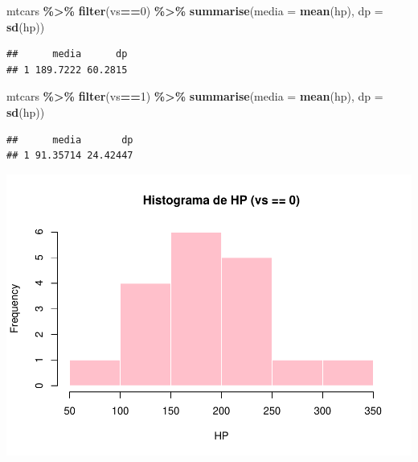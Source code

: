 \documentclass[
]{book}
\newenvironment{Shaded}{\begin{snugshade}}{\end{snugshade}}
\newcommand{\AttributeTok}[1]{\textcolor[rgb]{0.13,0.29,0.53}{#1}}
\newcommand{\DecValTok}[1]{\textcolor[rgb]{0.00,0.00,0.81}{#1}}
\newcommand{\FunctionTok}[1]{\textcolor[rgb]{0.13,0.29,0.53}{\textbf{#1}}}
\newcommand{\NormalTok}[1]{#1}
\newcommand{\SpecialCharTok}[1]{\textcolor[rgb]{0.81,0.36,0.00}{\textbf{#1}}}
\newcommand{\StringTok}[1]{\textcolor[rgb]{0.31,0.60,0.02}{#1}}
\begin{document}
\begin{Shaded}
\begin{Highlighting}[]
\NormalTok{mtcars }\SpecialCharTok{\%\textgreater{}\%} \FunctionTok{filter}\NormalTok{(vs}\SpecialCharTok{==}\DecValTok{0}\NormalTok{) }\SpecialCharTok{\%\textgreater{}\%} \FunctionTok{summarise}\NormalTok{(}\AttributeTok{media =} \FunctionTok{mean}\NormalTok{(hp), }\AttributeTok{dp =} \FunctionTok{sd}\NormalTok{(hp))}
\end{Highlighting}
\end{Shaded}

\begin{verbatim}
##      media      dp
## 1 189.7222 60.2815
\end{verbatim}

\begin{Shaded}
\begin{Highlighting}[]
\NormalTok{mtcars }\SpecialCharTok{\%\textgreater{}\%} \FunctionTok{filter}\NormalTok{(vs}\SpecialCharTok{==}\DecValTok{1}\NormalTok{) }\SpecialCharTok{\%\textgreater{}\%} \FunctionTok{summarise}\NormalTok{(}\AttributeTok{media =} \FunctionTok{mean}\NormalTok{(hp), }\AttributeTok{dp =} \FunctionTok{sd}\NormalTok{(hp))}
\end{Highlighting}
\end{Shaded}

\begin{verbatim}
##      media       dp
## 1 91.35714 24.42447
\end{verbatim}

\begin{Shaded}
\end{Shaded}

\begin{center}\includegraphics{AED_files/figure-latex/cap6_ex2_vs0-1} \end{center}
\end{document}

